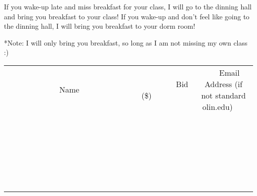 \documentclass[11pt]{article}
\begin{document}
If you wake-up late and miss breakfast for your class, I will go to the dinning hall and bring you breakfast to your class!
If you wake-up and don't feel like going to the dinning hall, I will bring you breakfast to your dorm room!

*Note: I will only bring you breakfast, so long as I am not missing my own class :)
\\[6ex]
\begin{tabular}{c c c}
~~~~~~~~~~~~~Name~~~~~~~~~~~~~ & ~~~~~~~~~Bid (\$)~~~~~~~~~  & ~~~Email Address (if not standard olin.edu)~~~\\
 & & \\
\hline
 & & \\
\hline
 & & \\
\hline
 & & \\
\hline
 & & \\
\hline
 & & \\
\hline
 & & \\
\hline
 & & \\
\hline
 & & \\
\hline
 & & \\
\hline
 & & \\
\hline
 & & \\
\hline
 & & \\
\hline
 & & \\
\hline
 & & \\
\hline
 & & \\
\hline
 & & \\
\hline
 & & \\
\hline
 & & \\
\hline
 & & \\
\hline
 & & \\
\hline
 & & \\
\hline
 & & \\
\hline
 & & \\
\hline
 & & \\
\hline
 & & \\
\hline
\end{tabular}
\newpage
\end{document}
